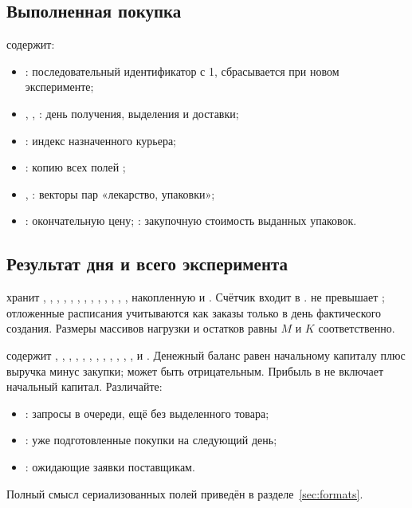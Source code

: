 \subsection{Выполненная покупка}
 содержит:
\begin{itemize}
  \item {}: последовательный идентификатор с 1, сбрасывается
        при новом эксперименте;
  \item {}, , :
        день получения, выделения и доставки;
  \item {}: индекс назначенного курьера;
  \item {}: копию всех полей ;
  \item {}, : векторы пар «лекарство, упаковки»;
  \item {}: окончательную цену;
        : закупочную стоимость выданных упаковок.
\end{itemize}

\subsection{Результат дня и всего эксперимента}
 хранит , ,
, , ,
, , ,
, ,
, ,
, накопленную  и .
Счётчик  входит в .
 не превышает ; отложенные
расписания учитываются как заказы только в день фактического создания.
Размеры массивов нагрузки и остатков равны $M$ и $K$ соответственно.

 содержит , ,
, ,
, ,
, ,
, , ,
,  и . Денежный баланс
равен начальному капиталу плюс выручка минус закупки; может быть отрицательным.
Прибыль в  не включает начальный капитал. Различайте:
\begin{itemize}
  \item {}: запросы в очереди, ещё без выделенного товара;
  \item {}: уже подготовленные покупки на следующий день;
  \item {}: ожидающие заявки поставщикам.
\end{itemize}
Полный смысл сериализованных полей приведён в разделе~\ref{sec:formats}.

